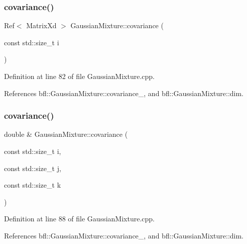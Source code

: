 \subsubsection{\texorpdfstring{covariance()}{covariance()}\hspace{0.1cm}{\footnotesize\ttfamily [2/6]}}
{\footnotesize\ttfamily Ref$<$ Matrix\+Xd $>$ Gaussian\+Mixture\+::covariance (\begin{DoxyParamCaption}\item[{const std\+::size\+\_\+t}]{i }\end{DoxyParamCaption})\hspace{0.3cm}{\ttfamily [inherited]}}



Definition at line 82 of file Gaussian\+Mixture.\+cpp.



References bfl\+::\+Gaussian\+Mixture\+::covariance\+\_\+, and bfl\+::\+Gaussian\+Mixture\+::dim.

\mbox{\label{classbfl_1_1GaussianMixture_ad2c74407e682e3b4322df2d0e1cef28e}} 
\subsubsection{\texorpdfstring{covariance()}{covariance()}\hspace{0.1cm}{\footnotesize\ttfamily [3/6]}}
{\footnotesize\ttfamily double \& Gaussian\+Mixture\+::covariance (\begin{DoxyParamCaption}\item[{const std\+::size\+\_\+t}]{i,  }\item[{const std\+::size\+\_\+t}]{j,  }\item[{const std\+::size\+\_\+t}]{k }\end{DoxyParamCaption})\hspace{0.3cm}{\ttfamily [inherited]}}



Definition at line 88 of file Gaussian\+Mixture.\+cpp.



References bfl\+::\+Gaussian\+Mixture\+::covariance\+\_\+, and bfl\+::\+Gaussian\+Mixture\+::dim.

\mbox{\label{classbfl_1_1GaussianMixture_a172c11264e6ff449a44ec21701eadc4d}} 

